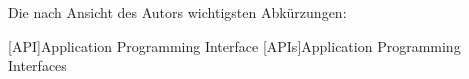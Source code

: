 \chapter*{\nameoftableofacronyms}
Die nach Ansicht des Autors wichtigsten Abkürzungen:
\bigskip

\begin{adjustwidth}{1.5em}{}
\begin{acronym}[AAAAA] %
	
	
	[API]{Application Programming Interface}
	[APIs]{Application Programming Interfaces}
	
\end{acronym}	
\end{adjustwidth}
